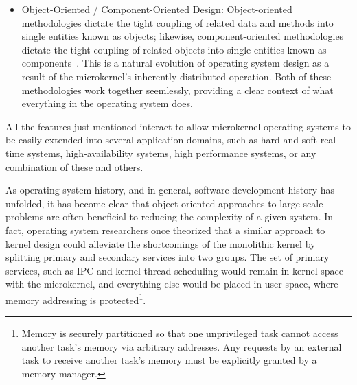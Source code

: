 \begin{itemize}
\item {\important Object-Oriented / Component-Oriented Design}:
{\important Object-oriented} methodologies dictate the tight coupling of
related data and methods into single entities known as
{\important objects}; likewise,
{\important component-oriented} methodologies dictate the tight coupling
of related objects into single entities known as
{\important components}~\cite{tanenbaum2002}.
This is a natural evolution of operating system design as a result of the
microkernel's inherently distributed operation.
Both of these methodologies work together seemlessly,
providing a clear context of what everything in the operating system does.

\end{itemize} %

All the features just mentioned interact to allow microkernel operating
systems to be easily extended into several application domains, such as
hard and soft real-time systems, high-availability systems, high
performance systems, or any combination of these and
others.

As operating system history, and in general, software development history
has unfolded, it has become clear that object-oriented approaches to
large-scale problems are often beneficial to reducing the complexity of a
given system.  In fact, operating system researchers once theorized that
a similar approach to kernel design could alleviate the shortcomings of
the monolithic kernel by splitting primary and secondary services into
two groups.  The set of primary services, such as IPC and kernel thread
scheduling would remain in kernel-space with the
microkernel, and everything else would be placed in user-space, where
memory addressing is
protected\footnote{Memory is securely partitioned so that one unprivileged
task cannot access another task's memory via arbitrary addresses.  Any
requests by an external task to receive another task's memory must be
explicitly granted by a memory manager.}.





